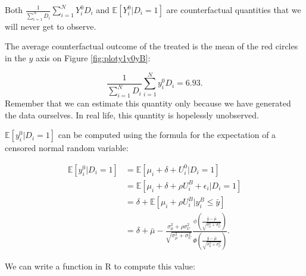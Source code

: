 \documentclass[]{book}
\newcommand{\esp}[1]{\mathbb{E}[ #1 ]}
\theoremstyle{definition}
\theoremstyle{definition}
\theoremstyle{definition}
\theoremstyle{remark}
\let\BeginKnitrBlock\begin \let\EndKnitrBlock\end
\begin{document}
\BeginKnitrBlock{definition}[Couterfactual]
\protect\hypertarget{def:counter}{}{\label{def:counter}
\iffalse (Couterfactual) \fi{} }Both
\(\frac{1}{\sum_{i=1}^ND_i}\sum_{i=1}^NY_i^0D_i\) and
\(\esp{Y_i^0|D_i=1}\) are counterfactual quantities that we will never
get to observe.
\EndKnitrBlock{definition}

\BeginKnitrBlock{example}
\protect\hypertarget{exm:unnamed-chunk-11}{}{\label{exm:unnamed-chunk-11}
}The average counterfactual outcome of the treated is the mean of the
red circles in the \(y\) axis on Figure \ref{fig:ploty1y0yB}:
\EndKnitrBlock{example} \[
\frac{1}{\sum_{i=1}^ND_i}\sum_{i=1}^Ny_i^0D_i= 6.93.
\] Remember that we can estimate this quantity only because we have
generated the data ourselves. In real life, this quantity is hopelessly
unobserved.

\(\esp{y_i^0|D_i=1}\) can be computed using the formula for the
expectation of a censored normal random variable:

\begin{align*}
\esp{y_i^0|D_i=1} & = \esp{\mu_i+\delta+U_i^0|D_i=1}\\
                  & = \esp{\mu_i+\delta+\rho U_i^B+\epsilon_i|D_i=1}\\
                  & = \delta + \esp{\mu_i+\rho U_i^B|y_i^B\leq\bar{y}}\\
                  & = \delta + \bar{\mu} - \frac{\sigma^2_{\mu}+\rho\sigma^2_U}{\sqrt{\sigma^2_{\mu}+\sigma^2_{U}}}\frac{\phi\left(\frac{\bar{y}-\bar{\mu}}{\sqrt{\sigma^2_{\mu}+\sigma^2_{U}}}\right)}{\Phi\left(\frac{\bar{y}-\bar{\mu}}{\sqrt{\sigma^2_{\mu}+\sigma^2_{U}}}\right)}.
\end{align*}

We can write a function in R to compute this value:
\end{document}
